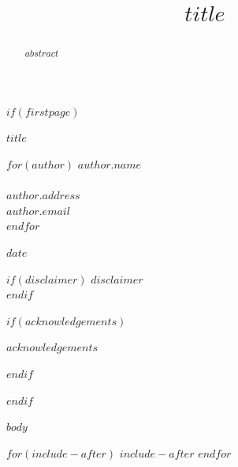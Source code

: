 \documentclass[$layout$,times,doublespace]{fmt/sagej}
\begin{document}
$if(firstpage)$

\begin{center}

\noindent\textbf{\Large{$title$}}

\vspace{10mm} %


$for(author)$
  \textbf{$author.name$} \\
   \\
  \textit{$author.address$} \\
  \textit{$author.email$} \\
  \vspace{5mm} %
$endfor$

\vspace{5mm} %

$date$ \\

\vspace{10mm} %

$if(disclaimer)$
  $disclaimer$ \\
$endif$

\end{center}

\vfill

$if(acknowledgements)$
  \begin{acks}
    $acknowledgements$
  \end{acks}
$endif$

\vfill

\newpage
$endif$



\title{$title$}

\begin{abstract}
$abstract$
\end{abstract}


\maketitle

\noindent\makebox[\linewidth]{\rule{\textwidth}{0.5pt}}



$body$



\theendnotes



\begingroup
\singlespacing\setlength{\parskip}{1em}


\endgroup



$for(include-after)$
$include-after$
$endfor$
\end{document}
